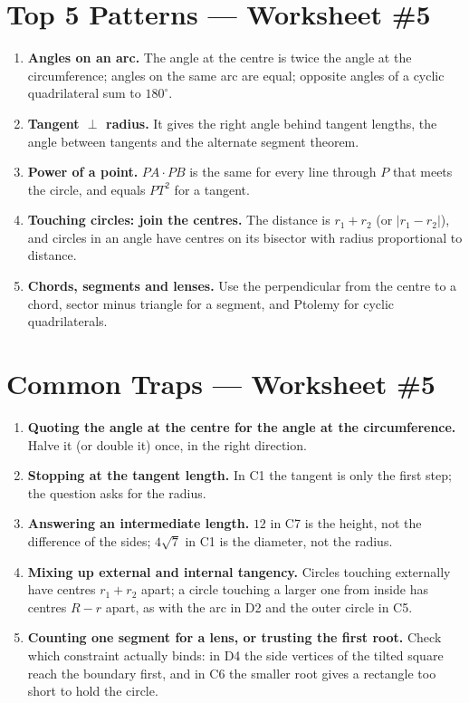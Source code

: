 \documentclass[11pt,a4paper]{article}
\begin{document}
\section*{Top 5 Patterns --- Worksheet \#5}
\begin{enumerate}[leftmargin=2em, itemsep=4pt]
  \item \textbf{Angles on an arc.} The angle at the centre is twice the angle at the circumference; angles on the same arc are equal; opposite angles of a cyclic quadrilateral sum to $180^\circ$. 
  \item \textbf{Tangent $\perp$ radius.} It gives the right angle behind tangent lengths, the angle between tangents and the alternate segment theorem. 
  \item \textbf{Power of a point.} $PA\cdot PB$ is the same for every line through $P$ that meets the circle, and equals $PT^2$ for a tangent. 
  \item \textbf{Touching circles: join the centres.} The distance is $r_1+r_2$ (or $|r_1-r_2|$), and circles in an angle have centres on its bisector with radius proportional to distance. 
  \item \textbf{Chords, segments and lenses.} Use the perpendicular from the centre to a chord, sector minus triangle for a segment, and Ptolemy for cyclic quadrilaterals. 
\end{enumerate}

\section*{Common Traps --- Worksheet \#5}
\begin{enumerate}[leftmargin=2em, itemsep=4pt]
  \item \textbf{Quoting the angle at the centre for the angle at the circumference.} Halve it (or double it) once, in the right direction. 
  \item \textbf{Stopping at the tangent length.} In C1 the tangent is only the first step; the question asks for the radius. 
  \item \textbf{Answering an intermediate length.} $12$ in C7 is the height, not the difference of the sides; $4\sqrt7$ in C1 is the diameter, not the radius. 
  \item \textbf{Mixing up external and internal tangency.} Circles touching externally have centres $r_1+r_2$ apart; a circle touching a larger one from inside has centres $R-r$ apart, as with the arc in D2 and the outer circle in C5. 
  \item \textbf{Counting one segment for a lens, or trusting the first root.} Check which constraint actually binds: in D4 the side vertices of the tilted square reach the boundary first, and in C6 the smaller root gives a rectangle too short to hold the circle. 
\end{enumerate}

\end{document}

